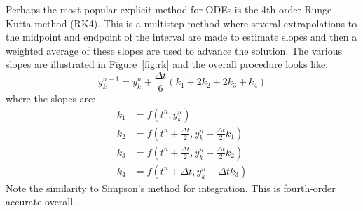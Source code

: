 Perhaps the most popular explicit method for ODEs is the 4th-order
Runge-Kutta method (RK4).  This is a multistep method where several
extrapolations to the midpoint and endpoint of the interval are
made to estimate slopes and then a weighted average of these slopes
are used to advance the solution.  The various slopes
are illustrated in Figure~\ref{fig:rk} and the overall procedure looks like:
\begin{equation}
y_k^{n+1} = y_k^n + \frac{\Delta t}{6} (k_1 + 2 k_2 + 2 k_3 + k_4)
\end{equation}
where the slopes are:
\begin{align}
k_1 &= f(t^n, y_k^n) \\
k_2 &= f(t^n + \tfrac{\Delta t}{2}, y_k^n + \tfrac{\Delta t}{2} k_1) \\
k_3 &= f(t^n + \tfrac{\Delta t}{2}, y_k^n + \tfrac{\Delta t}{2} k_2) \\
k_4 &= f(t^n + \Delta t, y_k^n + \Delta t k_3)
\end{align}
Note the similarity to Simpson's method for integration.  This is
fourth-order accurate overall.

